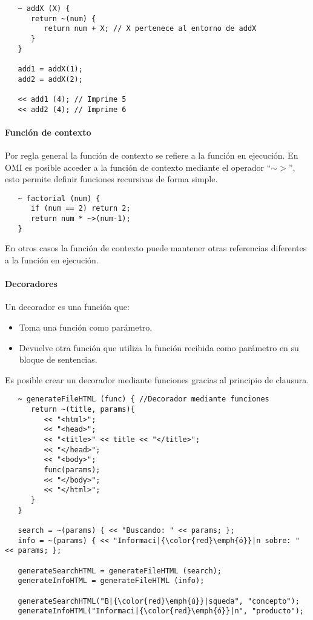 \begin{lstlisting}
   ~ addX (X) { 
      return ~(num) {
         return num + X; // X pertenece al entorno de addX
      }
   }
   
   add1 = addX(1);
   add2 = addX(2);
   
   << add1 (4); // Imprime 5
   << add2 (4); // Imprime 6
\end{lstlisting}

\paragraph{Función de contexto}
Por regla general la función de contexto se refiere a la función en ejecución. En OMI es 
posible acceder a la función de contexto mediante el operador ``$\sim>$'', esto permite definir 
funciones recursivas de forma simple. \\

\begin{lstlisting}
   ~ factorial (num) {
      if (num == 2) return 2;
      return num * ~>(num-1);
   }
\end{lstlisting}

En otros casos la función de contexto puede mantener otras referencias diferentes a la función 
en ejecución.

\paragraph{Decoradores}


Un decorador es una función que:
\begin{itemize}
\item Toma una función como parámetro. 
\item Devuelve otra función que utiliza la función recibida como parámetro en su bloque de sentencias.
\end{itemize}

Es posible crear un decorador mediante funciones gracias al principio de clausura. \\

\begin{lstlisting}
   ~ generateFileHTML (func) { //Decorador mediante funciones
      return ~(title, params){
         << "<html>";
         << "<head>";
         << "<title>" << title << "</title>";
         << "</head>";
         << "<body>";
         func(params);
         << "</body>";
         << "</html>";
      }
   }
   
   search = ~(params) { << "Buscando: " << params; };
   info = ~(params) { << "Informaci|{\color{red}\emph{ó}}|n sobre: " << params; };
   
   generateSearchHTML = generateFileHTML (search);
   generateInfoHTML = generateFileHTML (info);
   
   generateSearchHTML("B|{\color{red}\emph{ú}}|squeda", "concepto");
   generateInfoHTML("Informaci|{\color{red}\emph{ó}}|n", "producto");
\end{lstlisting}

